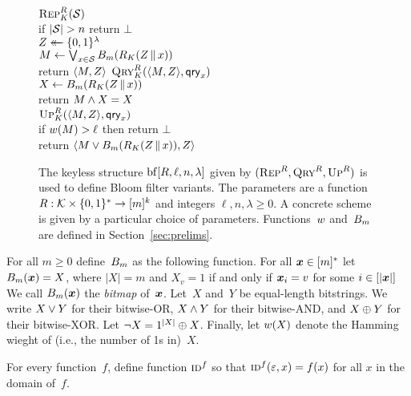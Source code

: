 \newcommand{\id}{\schemefont{id}}
\begin{figure}
  {
    \underline{$\textnormal{\textsc{Rep}}^R_K(\mathcal{S})$}\\[2pt]
      if $|\mathcal{S}| > n$ return $\bot$\\
      $Z \mathrel{\leftarrow\mkern-14mu\leftarrow} \{0,1\}^\lambda$\\
      $M \gets \bigvee_{x \in \mathcal{S}} {B}_m(R_K(Z \, \| \, x))$\\
      return $\langle M, Z \rangle$
  }
  {
    \underline{$\textnormal{\textsc{Qry}}^R_K(\langle M, Z \rangle,\mathsf{qry}_x)$}\\[2pt]
      $X \gets {B}_m(R_K(Z \, \| \, x))$\\
      return $M \wedge X = X$
    \\[6pt]
    \underline{$\textnormal{\textsc{Up}}^R_K(\langle M, Z \rangle,\mathsf{qry}_x)$}\\[2pt]
      if ${w}(M) > \ell$ then return $\bot$\\
      return $\langle M \vee {B}_m(R_K(Z \, \| \, x)), Z \rangle$
  }
  \caption{The keyless structure $\mathrm{bf}[R,\ell,n,\lambda]$ given by
  $(\textnormal{\textsc{Rep}}^R,\textnormal{\textsc{Qry}}^R,\textnormal{\textsc{Up}}^R)$ is used to define Bloom filter variants. The
  parameters are a function $R: \mathcal{K}\times\{0,1\}^* \to [m]^k$ and integers $\ell, n,
  \lambda \geq0$. A concrete scheme is given by a particular choice of
  parameters.  Functions~${w}$ and~${B}_m$ are defined in
  Section~\ref{sec:prelims}.
  }
  \label{fig:bf-def}
\end{figure}


%
For all $m\geq0$ define~${B}_m$ as the following function.
For all $\v.x\in[m]^*$ let $\bmap_m(\v.x) = X$, where
$|X|=m$ and $X_v=1$ if and only if $\v.x_i = v$ for some $i\in[|\v.x|]$
%
We call $\bmap_m(\v.x)$ the \emph{bitmap} of~$\v.x$.
%
Let~$X$ and~$Y$ be equal-length bitstrings. We write $X \vee Y$ for their
bitwise-OR, $X \wedge Y$ for their bitwise-AND, and $X \mathbin{\oplus} Y$ for their
bitwise-XOR. Let $\neg X = 1^{|X|} \mathbin{\oplus} X$.
%
Finally, let ${w}(X)$ denote the Hamming wieght of (i.e., the number of 1s in)~$X$.

%
For every function~$f$, define function $\id^f$ so that
$\id^f(\emptystr, x) = f(x)$ for all $x$ in the domain of~$f$.
%

